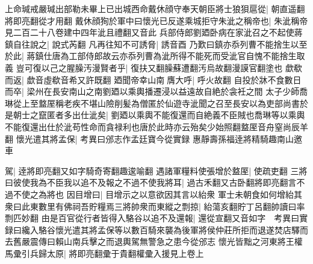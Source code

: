 上命瑊戒嚴瑊出部勒未畢上已出城西命戴休顔守奉天朝臣將士狼狽扈從|{
	朝直遥翻將即亮翻從才用翻}
戴休顔狥於軍中曰懷光已反遂乘城拒守朱泚之稱帝也|{
	朱泚稱帝見二百二十八卷建中四年泚且禮翻又音此}
兵部侍郎劉廼卧病在家泚召之不起使蔣鎮自往說之|{
	說式芮翻}
凡再往知不可誘脅|{
	誘音酉}
乃歎曰鎮亦忝列曹不能捨生以至於此|{
	蔣鎮仕唐為工部侍郎故云亦忝列曹為泚所得不能死而受泚官自愧不能捨生取義}
豈可復以己之腥臊汚漫賢者乎|{
	復扶又翻臊蘇遭翻汚烏故翻漫謨官翻塗也}
歔欷而返|{
	歔音虛欷音希又許既翻}
廼聞帝幸山南膺大呼|{
	呼火故翻}
自投於牀不食數日而卒|{
	梁州在長安南山之南劉廼以乘輿播遷浸以益遠故自絶於衾衽之間}
太子少師喬琳從上至盩厔稱老疾不堪山險削髪為僧匿於仙遊寺泚聞之召至長安以為吏部尚書於是朝士之竄匿者多出仕泚矣|{
	劉廼以乘輿不能復還而自絶義不臣賊也喬琳等以乘輿不能復還出仕於泚苟性命而貪禄利也唐於此時亦云殆矣少始照翻盩厔音舟窒尚辰羊翻}
懷光遣其將孟保|{
	考異曰邠志作孟廷寶今從實録}
惠靜壽孫福逹將精騎趣南山邀車

駕|{
	逹將即亮翻又如字騎奇寄翻趣逡喻翻}
遇諸軍糧料使張增於盩厔|{
	使疏吏翻}
三將曰彼使我為不臣我以追不及報之不過不使我將耳|{
	過古禾翻又古卧翻將即亮翻言不過不使之為將也}
因目增曰|{
	目增示之以意欲因其言以紿衆}
軍士未朝食如何增紿其衆曰此東數里有佛祠吾貯糧焉三將帥衆而東縱之剽掠|{
	紿蕩亥翻貯丁呂翻帥讀曰率剽匹妙翻}
由是百官從行者皆得入駱谷以追不及還報|{
	還從宣翻又音如字　考異曰實録曰纔入駱谷懷光遣其將孟保等以數百騎來襲為後軍將侯仲莊所拒而退遂焚店驛而去舊嚴震傳曰賴山南兵擊之而退輿駕無警急之患今從邠志}
懷光皆黜之河東將王權馬彚引兵歸太原|{
	將即亮翻彚于貴翻權彚入援見上卷上}


